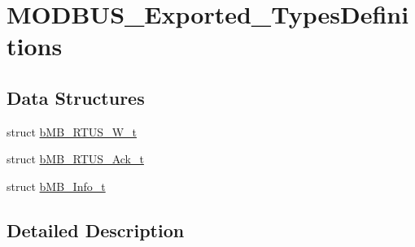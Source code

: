 \hypertarget{group___m_o_d_b_u_s___exported___types_definitions}{}\section{M\+O\+D\+B\+U\+S\+\_\+\+Exported\+\_\+\+Types\+Definitions}
\label{group___m_o_d_b_u_s___exported___types_definitions}
\subsection*{Data Structures}
\begin{DoxyCompactItemize}
\item 
struct \mbox{\hyperlink{structb_m_b___r_t_u_s___w__t}{b\+M\+B\+\_\+\+R\+T\+U\+S\+\_\+\+W\+\_\+t}}
\item 
struct \mbox{\hyperlink{structb_m_b___r_t_u_s___ack__t}{b\+M\+B\+\_\+\+R\+T\+U\+S\+\_\+\+Ack\+\_\+t}}
\item 
struct \mbox{\hyperlink{structb_m_b___info__t}{b\+M\+B\+\_\+\+Info\+\_\+t}}
\end{DoxyCompactItemize}


\subsection{Detailed Description}
